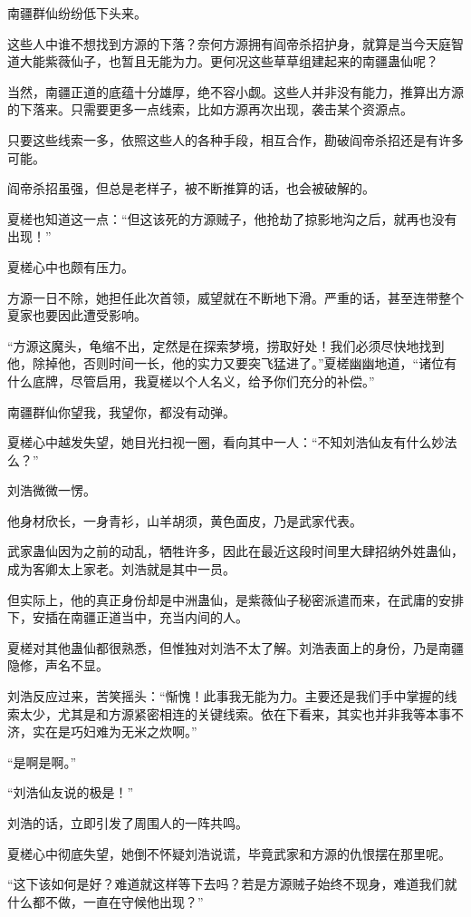 \begin{this_body}
南疆群仙纷纷低下头来。

这些人中谁不想找到方源的下落？奈何方源拥有阎帝杀招护身，就算是当今天庭智道大能紫薇仙子，也暂且无能为力。更何况这些草草组建起来的南疆蛊仙呢？

当然，南疆正道的底蕴十分雄厚，绝不容小觑。这些人并非没有能力，推算出方源的下落来。只需要更多一点线索，比如方源再次出现，袭击某个资源点。

只要这些线索一多，依照这些人的各种手段，相互合作，勘破阎帝杀招还是有许多可能。

阎帝杀招虽强，但总是老样子，被不断推算的话，也会被破解的。

夏槎也知道这一点：“但这该死的方源贼子，他抢劫了掠影地沟之后，就再也没有出现！”

夏槎心中也颇有压力。

方源一日不除，她担任此次首领，威望就在不断地下滑。严重的话，甚至连带整个夏家也要因此遭受影响。

“方源这魔头，龟缩不出，定然是在探索梦境，捞取好处！我们必须尽快地找到他，除掉他，否则时间一长，他的实力又要突飞猛进了。”夏槎幽幽地道，“诸位有什么底牌，尽管启用，我夏槎以个人名义，给予你们充分的补偿。”

南疆群仙你望我，我望你，都没有动弹。

夏槎心中越发失望，她目光扫视一圈，看向其中一人：“不知刘浩仙友有什么妙法么？”

刘浩微微一愣。

他身材欣长，一身青衫，山羊胡须，黄色面皮，乃是武家代表。

武家蛊仙因为之前的动乱，牺牲许多，因此在最近这段时间里大肆招纳外姓蛊仙，成为客卿太上家老。刘浩就是其中一员。

但实际上，他的真正身份却是中洲蛊仙，是紫薇仙子秘密派遣而来，在武庸的安排下，安插在南疆正道当中，充当内间的人。

夏槎对其他蛊仙都很熟悉，但惟独对刘浩不太了解。刘浩表面上的身份，乃是南疆隐修，声名不显。

刘浩反应过来，苦笑摇头：“惭愧！此事我无能为力。主要还是我们手中掌握的线索太少，尤其是和方源紧密相连的关键线索。依在下看来，其实也并非我等本事不济，实在是巧妇难为无米之炊啊。”

“是啊是啊。”

“刘浩仙友说的极是！”

刘浩的话，立即引发了周围人的一阵共鸣。

夏槎心中彻底失望，她倒不怀疑刘浩说谎，毕竟武家和方源的仇恨摆在那里呢。

“这下该如何是好？难道就这样等下去吗？若是方源贼子始终不现身，难道我们就什么都不做，一直在守候他出现？”


\end{this_body}
